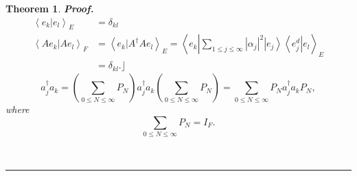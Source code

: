 \documentclass[aps,preprint]{revtex4}%
\newtheorem{theorem}{Theorem}
\newenvironment{proof}[1][Proof]{\noindent\textbf{#1.} }{\ \rule{0.5em}{0.5em}}
\begin{document}
\begin{theorem}
\begin{proof}
\begin{align}
\left\langle \left.  e_{k}\right\vert e_{l}\right\rangle _{E}  &  =\delta
_{kl}\\
\left\langle \left.  Ae_{k}\right\vert Ae_{l}\right\rangle _{F}  &
=\left\langle \left.  e_{k}\right\vert A^{\dagger}Ae_{l}\right\rangle
_{E}=\left\langle e_{k}\left\vert \sum_{1\leq j\leq\infty}\left\vert
\alpha_{j}\right\vert ^{2}\left\vert e_{j}\right\rangle \left\langle e_{j}%
^{d}\right\vert e_{l}\right.  \right\rangle _{E}\\
&  =\delta_{kl}.\rfloor
\end{align}%
\begin{equation}
a_{j}^{\dagger}a_{k}=\left(  \sum_{0\leq N\leq\infty}P_{N}\right)
a_{j}^{\dagger}a_{k}\left(  \sum_{0\leq N\leq\infty}P_{N}\right)  =\sum_{0\leq
N\leq\infty}P_{N}a_{j}^{\dagger}a_{k}P_{N},
\end{equation}
where%
\begin{equation}
\sum_{0\leq N\leq\infty}P_{N}=I_{F}.
\end{equation}

\end{proof}
\end{theorem}
\end{document}
